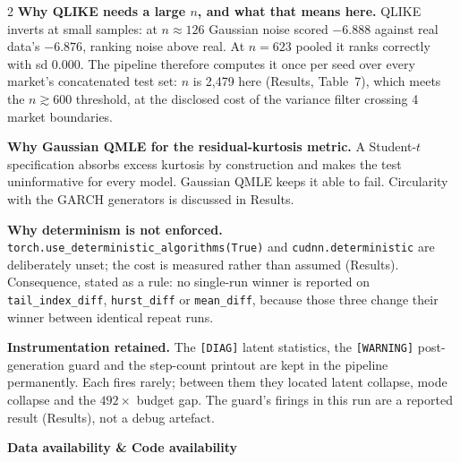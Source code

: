\documentclass[10pt]{article}
\begin{document}
\begin{multicols}{2}
\smallskip
\textbf{Why QLIKE needs a large $n$, and what that means here.}
QLIKE inverts at small samples: at $n\approx126$ Gaussian noise scored $-6.888$ against real data's $-6.876$, ranking noise above real. At $n=623$ pooled it ranks correctly with sd $0.000$. The pipeline therefore computes it once per seed over every market's concatenated test set: $n$ is 2,479 here (Results, Table~7), which meets the $n\gtrsim600$ threshold, at the disclosed cost of the variance filter crossing 4 market boundaries.

\smallskip
\textbf{Why Gaussian QMLE for the residual-kurtosis metric.}
A Student-$t$ specification absorbs excess kurtosis by construction and makes the test uninformative for every model. Gaussian QMLE keeps it able to fail. Circularity with the GARCH generators is discussed in Results.

\smallskip
\textbf{Why determinism is not enforced.}
\texttt{torch.use\_deterministic\_algorithms(True)} and \texttt{cudnn.deterministic} are deliberately unset; the cost is measured rather than assumed (Results). Consequence, stated as a rule: no single-run winner is reported on \texttt{tail\_index\_diff}, \texttt{hurst\_diff} or \texttt{mean\_diff}, because those three change their winner between identical repeat runs.

\smallskip
\textbf{Instrumentation retained.}
The \texttt{[DIAG]} latent statistics, the \texttt{[WARNING]} post-generation guard and the step-count printout are kept in the pipeline permanently. Each fires rarely; between them they located latent collapse, mode collapse and the $492\times$ budget gap. The guard's firings in this run are a reported result (Results), not a debug artefact.


\end{multicols}

\clearpage

\begin{tcolorbox}[
  colback=NavyBg, colframe=NavyBg!60!black, arc=4pt,
  left=8pt, right=8pt, top=4pt, bottom=4pt,
  before skip=0pt, after skip=10pt]
{\large\bfseries\color{Navy} Data availability \& Code availability}
\end{tcolorbox}
\end{document}
